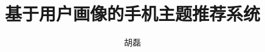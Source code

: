 \documentclass[master,oneside,euler,openright,macfonts]{ustcthesis}
\title{基于用户画像的手机主题推荐系统}%
\author{胡磊}
\begin{document}
  \maketitle

\frontmatter
\makeatletter
\ifustc@bachelor
	
	
	\tableofcontents

	\ustclot
	\ustclof
	\ustcloa
	
\else
	\tableofcontents

	\ustclot
	\ustclof
	\ustcloa
	
\fi
\makeatother

\mainmatter

   
   
   
  
  
  

\backmatter

  


  \makeatletter
  \ifustc@bachelor\relax\else
  \fi
  \makeatother
\end{document}
